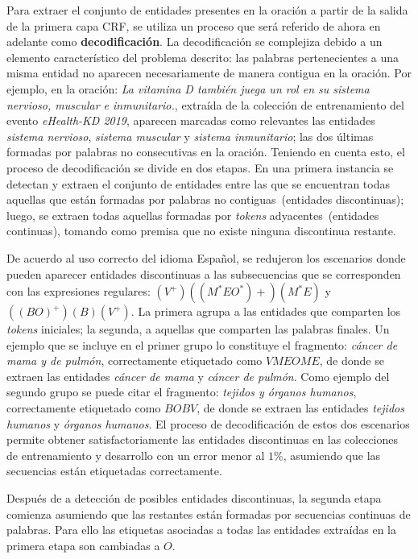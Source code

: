 Para extraer el conjunto de entidades presentes en la oración a partir de la salida de la primera capa CRF, se utiliza un proceso que será referido de ahora en adelante como \textbf{decodificación}.
La decodificación se complejiza debido a un elemento característico del problema descrito: las palabras pertenecientes a una misma entidad no aparecen necesariamente de manera contigua en la oración.
Por ejemplo, en la oración: \textit{La vitamina D también juega un rol en su sistema nervioso, muscular e inmunitario.}, extraída de la colección de entrenamiento del evento \textit{eHealth-KD 2019}, aparecen marcadas como relevantes las entidades \textit{sistema nervioso}, \textit{sistema muscular} y \textit{sistema inmunitario}; las dos últimas formadas por palabras no consecutivas en la oración.
Teniendo en cuenta esto, el proceso de decodificación se divide en dos etapas.
En una primera instancia se detectan y extraen el conjunto de entidades entre las que se encuentran todas aquellas que están formadas por palabras no contiguas~(entidades discontinuas); luego, se extraen todas aquellas formadas por \textit{tokens} adyacentes~(entidades continuas), tomando como premisa que no existe ninguna discontinua restante.

De acuerdo al uso correcto del idioma Español, se redujeron los escenarios donde pueden aparecer entidades discontinuas a las subsecuencias que se corresponden con las expresiones regulares: $(V^+)((M^*EO^*)+)(M^*E)$ y $((BO)^+)(B)(V^+)$.
La primera agrupa a las entidades que comparten los \textit{tokens} iniciales; la segunda, a aquellas que comparten las palabras finales.
Un ejemplo que se incluye en el primer grupo lo constituye el fragmento: \textit{cáncer de mama y de pulmón}, correctamente etiquetado como $VMEOME$, de donde se extraen las entidades \textit{cáncer de mama} y \textit{cáncer de pulmón}.
Como ejemplo del segundo grupo se puede citar el fragmento: \textit{tejidos y órganos humanos}, correctamente etiquetado como $BOBV$, de donde se extraen las entidades \textit{tejidos humanos} y \textit{órganos humanos}.
El proceso de decodificación de estos dos escenarios permite obtener satisfactoriamente las entidades discontinuas en las colecciones de entrenamiento y desarrollo con un error menor al $1\%$, asumiendo que las secuencias están etiquetadas correctamente.


Después de a detección de posibles entidades discontinuas, la segunda etapa comienza asumiendo que las restantes están formadas por secuencias continuas de palabras.
Para ello las etiquetas asociadas a todas las entidades extraídas en la primera etapa son cambiadas a $O$. 


